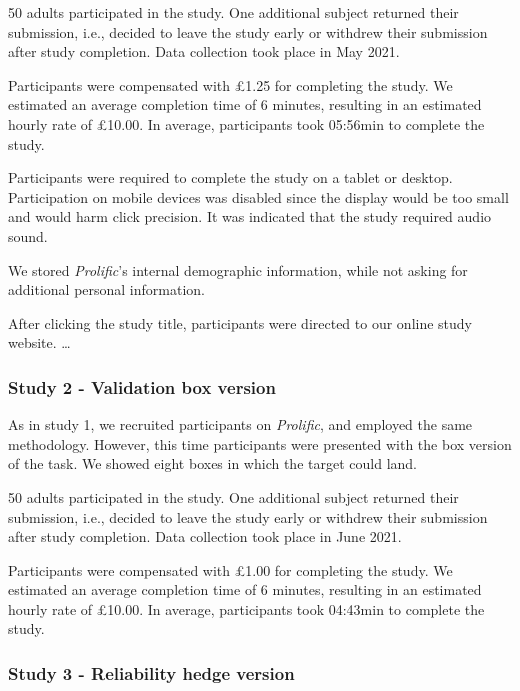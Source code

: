 \documentclass[
  english,
  man,floatsintext]{apa6}
\begin{document}
50 adults participated in the study.
One additional subject returned their submission,
i.e., decided to leave the study early or withdrew their submission after study completion.
Data collection took place in May 2021.

Participants were compensated with £1.25 for completing the study.
We estimated an average completion time of 6 minutes, resulting in an estimated hourly rate of £10.00.
In average, participants took 05:56min to complete the study.

Participants were required to complete the study on a tablet or desktop.
Participation on mobile devices was disabled
since the display would be too small and would harm click precision.
It was indicated that the study required audio sound.

We stored \emph{Prolific}'s internal demographic information,
while not asking for additional personal information.

After clicking the study title, participants were directed to our online study website.
\ldots{}

\hypertarget{study-2---validation-box-version}{%
\subsubsection{Study 2 - Validation box version}\label{study-2---validation-box-version}}

As in study 1, we recruited participants on \emph{Prolific}, and employed the same methodology.
However, this time participants were presented with the box version of the task.
We showed eight boxes in which the target could land.

50 adults participated in the study.
One additional subject returned their submission,
i.e., decided to leave the study early or withdrew their submission after study completion.
Data collection took place in June 2021.

Participants were compensated with £1.00 for completing the study.
We estimated an average completion time of 6 minutes, resulting in an estimated hourly rate of £10.00.
In average, participants took 04:43min to complete the study.

\hypertarget{study-3---reliability-hedge-version}{%
\subsubsection{Study 3 - Reliability hedge version}\label{study-3---reliability-hedge-version}}
\end{document}
